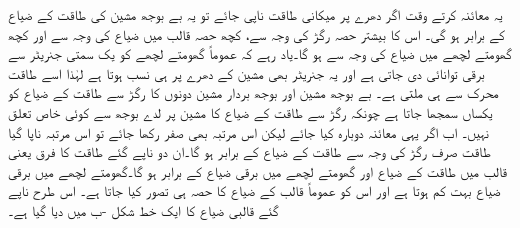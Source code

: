 یہ معائنہ کرتے وقت اگر دھرے پر میکانی طاقت  ناپی جائے تو یہ بے بوجھ مشین کی طاقت کے ضیاع کے برابر ہو گی۔ اس کا بیشتر حصہ رگڑ کی وجہ سے، کچھ حصہ قالب میں ضیاع کی وجہ سے اور کچھ گھومتے لچھے میں ضیاع کی وجہ سے ہو گا۔یاد رہے کہ عموماً گھومتے لچھے کو یک سمتی جنریٹر سے برقی توانائی دی جاتی ہے اور یہ جنریٹر بھی مشین کے دھرے پر ہی نسب ہوتا ہے لہٰذا اسے طاقت محرک سے ہی ملتی ہے۔ بے بوجھ مشین اور بوجھ بردار مشین دونوں کا رگڑ سے طاقت کے ضیاع کو یکساں سمجھا جاتا ہے چونکہ رگڑ سے طاقت کے ضیاع کا مشین پر لدے بوجھ سے کوئی خاص تعلق نہیں۔ اب اگر یہی معائنہ دوبارہ کیا جائے لیکن اس مرتبہ  بھی صفر رکھا جائے تو اس مرتبہ ناپا گیا طاقت  صرف رگڑ کی وجہ سے طاقت کے ضیاع کے برابر ہو گا۔ان دو ناپے گئے طاقت کا فرق یعنی  قالب میں طاقت کے ضیاع  اور گھومتے لچھے میں برقی ضیاع کے برابر ہو گا۔گھومتے لچھے میں برقی ضیاع بہت کم ہوتا ہے اور اس کو عموماً قالب کے ضیاع کا حصہ ہی تصور کیا جاتا ہے۔ اس طرح ناپے گئے قالبی ضیاع کا ایک خط شکل  -ب میں دیا گیا ہے۔


